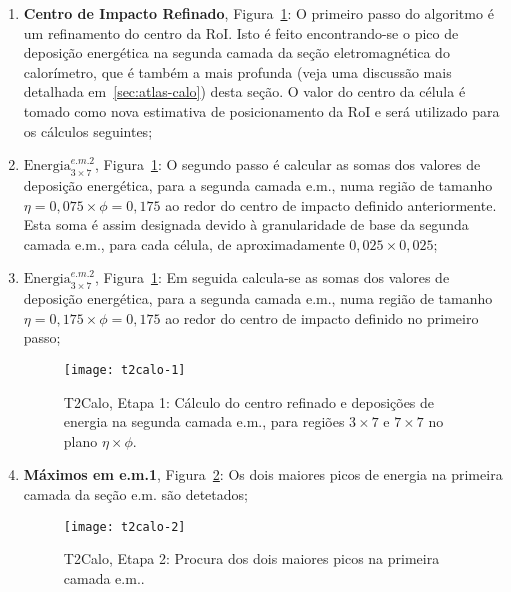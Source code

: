 \begin{enumerate}
\item \textbf{Centro de Impacto Refinado}, Figura~\ref{fig:t2calo-1}: O
primeiro passo do algoritmo é um refinamento do centro da RoI. Isto é feito
encontrando-se o pico de deposi\-ção ener\-gé\-tica na segunda camada da
se\-ção eletroma\-gné\-tica do calo\-rí\-metro, que é tam\-bém a mais profunda
(veja uma discus\-são mais detalhada em~\ref{sec:atlas-calo}) desta se\-ção. O
valor do centro da cé\-lula é tomado como nova estimativa de posicionamento da
RoI e será utilizado para os cál\-culos seguintes;

\item \textbf{$\text{Energia}^{e.m.2}_{3 \times 7}$},
Figura~\ref{fig:t2calo-1}: O segundo passo é calcular as somas dos valores de
deposição energética, para a segunda camada e.m., numa região de tamanho
$\eta=0,075 \times \phi=0,175$ ao redor do centro de impacto definido
anteriormente. Esta soma é assim designada devido à granularidade de base da
segunda camada e.m., para cada célula, de aproximadamente $0,025 \times
0,025$;

\item \textbf{$\text{Energia}^{e.m.2}_{3 \times 7}$},
Figura~\ref{fig:t2calo-1}: Em seguida calcula-se as somas dos valores de
deposi\-ção ener\-gé\-tica, para a segunda camada e.m., numa região de tamanho
$\eta=0,175 \times \phi=0,175$ ao redor do centro de impacto definido no
primeiro passo;

\begin{figure}
\begin{center}
\texttt{[image: t2calo-1]}
\end{center}
\caption{T2Calo, Etapa 1: Cálculo do centro refinado e deposições de
energia na segunda camada e.m., para regiões $3\times7$ e $7\times7$ no plano 
$\eta\times\phi$.}
\label{fig:t2calo-1}
\end{figure}

\item \textbf{Máximos em e.m.1}, Figura~\ref{fig:t2calo-2}: Os dois maiores
picos de energia na primeira camada da seção e.m. são detetados;

\begin{figure}
\begin{center}
\texttt{[image: t2calo-2]}
\end{center}
\caption{T2Calo, Etapa 2: Procura dos dois maiores picos na primeira camada e.m..}
\label{fig:t2calo-2}
\end{figure}


\end{enumerate}
